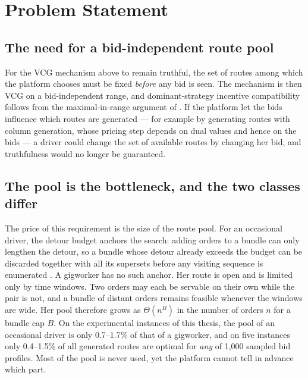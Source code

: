 \section{Problem Statement}
\label{sec:problem}

\subsection{The need for a bid-independent route pool}

For the VCG mechanism above to remain truthful, the set of routes among
which the platform chooses must be fixed \emph{before} any bid is seen. The
mechanism is then VCG on a bid-independent range, and dominant-strategy
incentive compatibility follows from the maximal-in-range argument of
\citet{nisan2007computationally}. If the platform let the bids influence
which routes are generated --- for example by generating routes with column
generation, whose pricing step depends on dual values and hence on the bids
--- a driver could change the set of available routes by changing her bid,
and truthfulness would no longer be guaranteed.

\subsection{The pool is the bottleneck, and the two classes differ}

The price of this requirement is the size of the route pool. For an
occasional driver, the detour budget anchors the search: adding orders to a
bundle can only lengthen the detour, so a bundle whose detour already
exceeds the budget can be discarded together with all its supersets before
any visiting sequence is enumerated \citep{li2026auction}. A gigworker has no
such anchor. Her route is open and is limited only by time windows. Two
orders may each be servable on their own while the pair is not, and a bundle
of distant orders remains feasible whenever the windows are wide. Her pool
therefore grows as $\Theta(n^B)$ in the number of orders $n$ for a bundle cap
$B$. On the experimental instances of this thesis, the pool of an occasional
driver is only 0.7--1.7\% of that of a gigworker, and on five instances only
0.4--1.5\% of all generated routes are optimal for \emph{any} of 1,000 sampled
bid profiles. Most of the pool is never used, yet the platform cannot tell
in advance which part.

